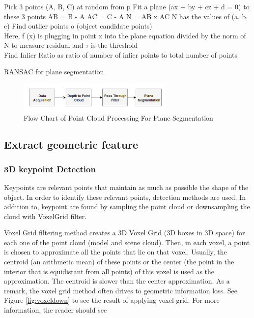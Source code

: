 \begin{algorithm}[H]
\SetAlgoLined
{}
 {
 Pick 3 points (A, B, C) at random from p \;
 Fit a plane (ax + by + cz + d = 0) to these 3 points\;
    AB = B - A\;
    AC = C - A\;
    N = AB x AC\;
    N has the values of (a, b, c)\;
    Find outlier points o (object candidate points)\\
    Here, f (x) is plugging in point x into the plane equation divided by the norm of N to measure residual and $\tau$ is the threshold\\
    Find Inlier Ratio as ratio of number of inlier points to total number of points
}
\caption{RANSAC for plane segmentation
\label{alg:algPlane}
\cite{cadPipeline3}}
\end{algorithm}

\begin{figure}[!h]
\begin{center}
\includegraphics[width=3in]{diagrams/planesegmentation.png}
\caption{Flow Chart of Point Cloud Processing For Plane Segmentation}
\label{fig:planesegmentation}
\end{center}
\end{figure}

\subsection{Extract geometric feature}
\subsubsection{3D keypoint Detection}

Keypoints are relevant points that maintain as much as possible the shape of the object. In order to identify these relevant points, detection methods are used. In addition to, keypoint are found by sampling the point cloud or downsampling the cloud with  VoxelGrid filter.

Voxel Grid filtering method \cite{algFiltering} creates a 3D Voxel Grid
(3D boxes in 3D space) for each one of the point cloud (model and scene cloud). Then, in each voxel, a point is chosen to approximate all the points that lie on that voxel. Usually, the centroid (an arithmetic mean) of these points or the center (the point in the interior that is equidistant from all points) of this voxel is used as the approximation. The centroid is slower than the center approximation. As a remark, the voxel grid method often drives to geometric information loss. See Figure \ref{fig:voxeldown} to see the result of applying voxel grid. For more information, the reader should see \cite{algDownsampling}

